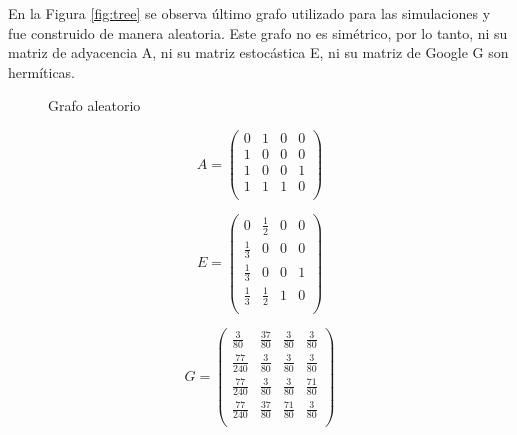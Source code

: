 En la Figura \ref{fig:tree} se observa último grafo utilizado para las simulaciones y fue construido de manera aleatoria. Este grafo no es simétrico, por lo tanto, ni su matriz de adyacencia A, ni su matriz estocástica E, ni su matriz de Google G son hermíticas.

\begin{figure}[H]
    \centering
    \caption[Grafo aleatorio]{Grafo aleatorio}
    \label{fig:any}
\end{figure}

\begin{equation}
    A =
    \begin{pmatrix}
        0 & 1 & 0 & 0 \\
        1 & 0 & 0 & 0 \\
        1 & 0 & 0 & 1 \\
        1 & 1 & 1 & 0 \\
    \end{pmatrix}
\end{equation}

\begin{equation}
    E =
    \begin{pmatrix}
        0 & \frac{1}{2} & 0 & 0 \\
        \frac{1}{3} & 0 & 0 & 0 \\
        \frac{1}{3} & 0 & 0 & 1 \\
        \frac{1}{3} & \frac{1}{2} & 1 & 0 \\
    \end{pmatrix}
\end{equation}

\begin{equation}
    G =
    \begin{pmatrix}
        \frac{3}{80} & \frac{37}{80} & \frac{3}{80} & \frac{3}{80} \\
        \frac{77}{240} & \frac{3}{80} & \frac{3}{80} & \frac{3}{80} \\
        \frac{77}{240} & \frac{3}{80} & \frac{3}{80} & \frac{71}{80} \\
        \frac{77}{240} & \frac{37}{80} & \frac{71}{80} & \frac{3}{80} \\
    \end{pmatrix}
\end{equation}

